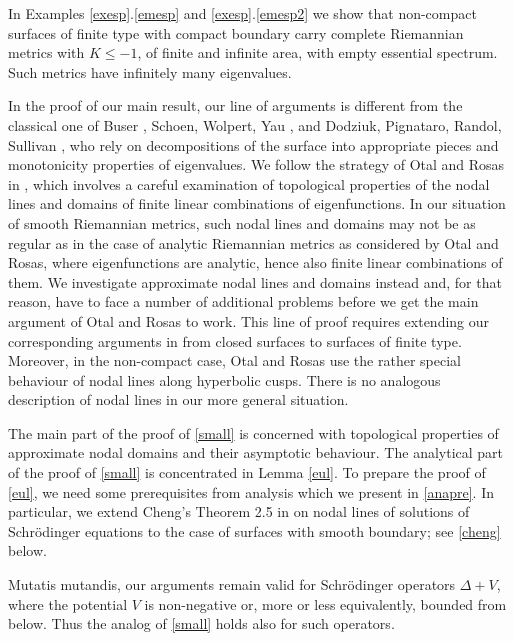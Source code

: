 \begin{rems}
\begin{inparaenum}[1)]
\item\label{ess2}
In Examples \ref{exesp}.\ref{emesp} and \ref{exesp}.\ref{emesp2}
we show that non-compact surfaces of finite type with compact boundary
carry complete Riemannian metrics with $K\le-1$, of finite and infinite area,
with empty essential spectrum.
Such metrics have infinitely many eigenvalues.
\end{inparaenum}
\end{rems}

In the proof of our main result,
our line of arguments is different from the classical one
of Buser \cite{Bu1},  Schoen, Wolpert, Yau \cite{SWY},
and Dodziuk, Pignataro, Randol, Sullivan \cite{DPRS},
who rely on decompositions of the surface into appropriate pieces
and monotonicity properties of eigenvalues.
We follow the strategy of Otal and Rosas in \cite{OR},
which involves a careful examination of topological properties of the nodal lines
and domains of finite linear combinations of eigenfunctions.
In our situation of smooth Riemannian metrics,
such nodal lines and domains may not be as regular as
in the case of analytic Riemannian metrics as considered by Otal and Rosas,
where eigenfunctions are analytic, hence also finite linear combinations of them.
We investigate approximate nodal lines and domains instead and,
for that reason, have to face a number of additional problems
before we get the main argument of Otal and Rosas to work.
This line of proof requires extending our corresponding arguments in \cite{BMM}
from closed surfaces to surfaces of finite type.
Moreover, in the non-compact case,
Otal and Rosas use the rather special behaviour of nodal lines along hyperbolic cusps.
There is no analogous description of nodal lines in our more general situation.

The main part of the proof of \cref{small} is concerned with topological properties
of approximate nodal domains and their asymptotic behaviour.
The analytical part of the proof of \cref{small} is concentrated in Lemma \ref{eul}.
To prepare the proof of \cref{eul},
we need some prerequisites from analysis which we present in \cref{anapre}.
In particular, we extend Cheng's Theorem 2.5 in \cite{Che}
on nodal lines of solutions of Schr\"odinger equations
to the case of surfaces with smooth boundary; see \cref{cheng} below.

Mutatis mutandis, our arguments remain valid for Schr\"odinger operators $\Delta+V$,
where the potential $V$ is non-negative or, more or less equivalently,
bounded from below.
Thus the analog of \cref{small} holds also for such operators.


